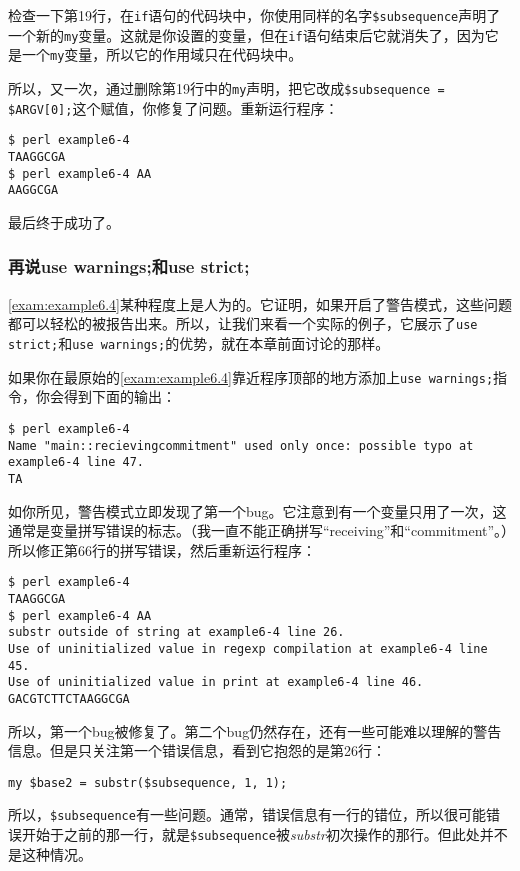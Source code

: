 检查一下第19行，在\verb|if|语句的代码块中，你使用同样的名字\verb|$subsequence|声明了一个新的\verb|my|变量。这就是你设置的变量，但在\verb|if|语句结束后它就消失了，因为它是一个\verb|my|变量，所以它的作用域只在代码块中。

所以，又一次，通过删除第19行中的\verb|my|声明，把它改成\verb|$subsequence = $ARGV[0];|这个赋值，你修复了问题。重新运行程序：

\begin{lstlisting}
$ perl example6-4
TAAGGCGA
$ perl example6-4 AA
AAGGCGA 
\end{lstlisting}

最后终于成功了。

\subsubsection{再说use warnings;和use strict;}
\autoref{exam:example6.4}某种程度上是人为的。它证明，如果开启了警告模式，这些问题都可以轻松的被报告出来。所以，让我们来看一个实际的例子，它展示了\verb|use strict;|和\verb|use warnings;|的优势，就在本章前面讨论的那样。

如果你在最原始的\autoref{exam:example6.4}靠近程序顶部的地方添加上\verb|use warnings;|指令，你会得到下面的输出：

\begin{lstlisting}
$ perl example6-4 
Name "main::recievingcommitment" used only once: possible typo at example6-4 line 47.
TA 
\end{lstlisting}

如你所见，警告模式立即发现了第一个bug。它注意到有一个变量只用了一次，这通常是变量拼写错误的标志。（我一直不能正确拼写“receiving”和“commitment”。）所以修正第66行的拼写错误，然后重新运行程序：

\begin{lstlisting}
$ perl example6-4 
TAAGGCGA
$ perl example6-4 AA
substr outside of string at example6-4 line 26.
Use of uninitialized value in regexp compilation at example6-4 line 45.
Use of uninitialized value in print at example6-4 line 46.
GACGTCTTCTAAGGCGA   
\end{lstlisting}

所以，第一个bug被修复了。第二个bug仍然存在，还有一些可能难以理解的警告信息。但是只关注第一个错误信息，看到它抱怨的是第26行：

\begin{lstlisting}
my $base2 = substr($subsequence, 1, 1);
\end{lstlisting}

所以，\verb|$subsequence|有一些问题。通常，错误信息有一行的错位，所以很可能错误开始于之前的那一行，就是\verb|$subsequence|被\textit{substr}初次操作的那行。但此处并不是这种情况。

